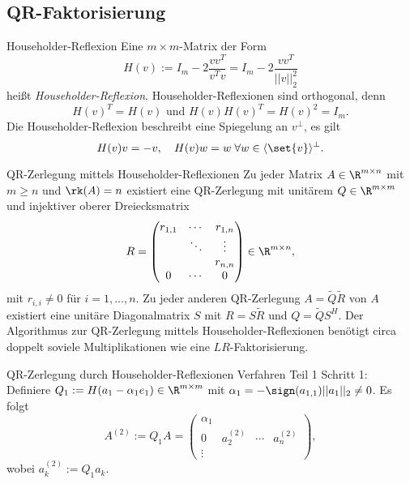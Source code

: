 \subsection*{QR-Faktorisierung}

\begin{karte}{Householder-Reflexion}
    Eine \( m\times m \)-Matrix der Form 
    \[ H(v) := I_m - 2 \frac{ v v^T }{ v^T v } = I_m - 2 \frac{v v^T}{||v||_2^2} \]
    heißt \textit{Householder-Reflexion}. Householder-Reflexionen sind orthogonal, 
    denn 
    \[ H(v)^T = H(v) \text{ und } H(v)H(v)^T = H(v)^2 = I_m. \]
    Die Householder-Reflexion beschreibt eine Spiegelung an \( v^\bot \), es gilt 
    \[ H(v)v = -v, \quad H(v)w = w \;\forall w\in \langle \set{v}\rangle^\bot. \]
\end{karte}

\begin{karte}{QR-Zerlegung mittels Householder-Reflexionen}
    Zu jeder Matrix \( A\in \R^{m\times n} \) mit \( m \geq n \) und 
    \( \rk(A) = n \) existiert eine QR-Zerlegung mit 
    unitärem \( Q \in \R^{m\times m} \) und injektiver oberer Dreiecksmatrix 
    \[ R = \begin{pmatrix}
        r_{1,1} & \cdots & r_{1,n} \\
        & \ddots & \vdots \\
        &&r_{n,n} \\
        0 &\cdots &0
    \end{pmatrix} \in \R^{m\times n}, \]
    mit \( r_{i,i} \neq 0 \) für \( i = 1,\ldots, n \).
    Zu jeder anderen QR-Zerlegung \( A = \tilde{Q}\tilde{R} \) von \(A\) 
    existiert eine unitäre Diagonalmatrix \( S \) mit 
    \( R = S\tilde{R} \) und \( Q = \tilde{Q} S^H \).
    Der Algorithmus zur QR-Zerlegung mittels Householder-Reflexionen 
    benötigt circa doppelt soviele Multiplikationen wie eine \(LR\)-Faktorisierung.
\end{karte}

\begin{karte}{QR-Zerlegung durch Householder-Reflexionen Verfahren Teil 1}
    Schritt 1: Definiere \(Q_1 := H(a_1 - \alpha_1 e_1) \in \R^{m\times m} \) 
    mit \( \alpha_1 = - \sign(a_{1,1}) ||a_1||_2 \neq 0 \).
    Es folgt 
    \[ A^{(2)} := Q_1 A = \left(\begin{array}{c|c|c|c}
        \alpha_1 & & & \\
        0 & a_2^{(2)} & \cdots & a_n^{(2)} \\
        \vdots &&&
    \end{array} \right), \]
    wobei \( a_k^{(2)} := Q_1 a_k \).
\end{karte}

